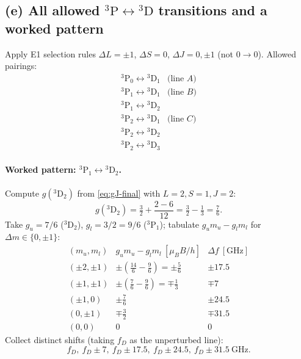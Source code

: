 \documentclass[11pt]{article}
\begin{document}
\subsection*{(e) All allowed $^{3}\mathrm{P}\leftrightarrow{}^{3}\mathrm{D}$ transitions and a worked pattern}

Apply E1 selection rules $\Delta L=\pm 1$, $\Delta S=0$, $\Delta J=0,\pm 1$ (not $0\to 0$). Allowed pairings:
\begin{equation}
\begin{array}{l|l}
^{3}\mathrm{P}_{0}\leftrightarrow{}^{3}\mathrm{D}_{1} & \text{(line }A\text{)} \\
^{3}\mathrm{P}_{1}\leftrightarrow{}^{3}\mathrm{D}_{1} & \text{(line }B\text{)} \\
^{3}\mathrm{P}_{1}\leftrightarrow{}^{3}\mathrm{D}_{2} & \\
^{3}\mathrm{P}_{2}\leftrightarrow{}^{3}\mathrm{D}_{1} & \text{(line }C\text{)} \\
^{3}\mathrm{P}_{2}\leftrightarrow{}^{3}\mathrm{D}_{2} & \\
^{3}\mathrm{P}_{2}\leftrightarrow{}^{3}\mathrm{D}_{3} &
\end{array}
\label{eq:all-transitions}
\end{equation}

\paragraph{Worked pattern: $^{3}\mathrm{P}_{1}\leftrightarrow{}^{3}\mathrm{D}_{2}$.} Compute $g(^{3}\mathrm{D}_{2})$ from \eqref{eq:gJ-final} with $L=2,S=1,J=2$:
\begin{equation}
g(^{3}\mathrm{D}_{2})=\tfrac{3}{2}+\frac{2-6}{12}=\tfrac{3}{2}-\tfrac{1}{3}=\tfrac{7}{6}.
\end{equation}
Take $g_{u}=7/6$ ($^{3}\mathrm{D}_{2}$), $g_{l}=3/2=9/6$ ($^{3}\mathrm{P}_{1}$); tabulate $g_{u}m_{u}-g_{l}m_{l}$ for $\Delta m\in\{0,\pm 1\}$:
\begin{equation}
\begin{array}{c|c|c}
(m_{u},m_{l}) & g_{u}m_{u}-g_{l}m_{l}\ [\mu_{B}B/h] & \Delta f\ [\mathrm{GHz}] \\ \hline
(\pm 2,\pm 1) & \pm(\tfrac{14}{6}-\tfrac{9}{6})=\pm\tfrac{5}{6} & \pm 17.5 \\
(\pm 1,\pm 1) & \pm(\tfrac{7}{6}-\tfrac{9}{6})=\mp\tfrac{1}{3} & \mp 7 \\
(\pm 1,0) & \pm\tfrac{7}{6} & \pm 24.5 \\
(0,\pm 1) & \mp\tfrac{3}{2} & \mp 31.5 \\
(0,0) & 0 & 0
\end{array}
\label{eq:P1D2-table}
\end{equation}
Collect distinct shifts (taking $f_{D}$ as the unperturbed line):
\begin{equation}
\boxed{\;f_{D},\ f_{D}\pm 7,\ f_{D}\pm 17.5,\ f_{D}\pm 24.5,\ f_{D}\pm 31.5\ \mathrm{GHz}.\;}
\label{eq:P1D2-pattern}
\end{equation}
\end{document}
